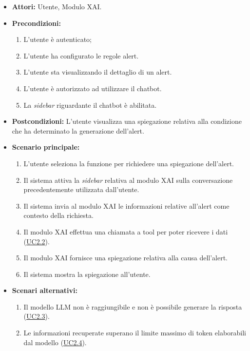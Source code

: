 \label{uc:uc8}
\begin{itemize}
    \item \textbf{Attori:} Utente, Modulo XAI.
    \item \textbf{Precondizioni:} 
        \begin{enumerate}
            \item L'utente è autenticato; 
            \item L'utente ha configurato le regole alert.
            \item L'utente sta visualizzando il dettaglio di un alert.
            \item L'utente è autorizzato ad utilizzare il chatbot.
            \item La \textit{sidebar} riguardante il chatbot è abilitata.
        \end{enumerate}
    \item \textbf{Postcondizioni:} L'utente visualizza una spiegazione relativa alla condizione che ha determinato la generazione dell'alert.
    \item \textbf{Scenario principale:}
        \begin{enumerate}
            \item L'utente seleziona la funzione per richiedere una spiegazione dell'alert.
            \item Il sistema attiva la \textit{sidebar} relativa al modulo XAI sulla conversazione precedentemente utilizzata dall'utente.
            \item Il sistema invia al modulo XAI le informazioni relative all'alert come contesto della richiesta.
            \item Il modulo XAI effettua una chiamata a tool per poter ricevere i dati (\hyperref[uc:uc2.2]{UC2.2}).
            \item Il modulo XAI fornisce una spiegazione relativa alla causa dell'alert.
            \item Il sistema mostra la spiegazione all'utente.
        \end{enumerate}
    \item \textbf{Scenari alternativi:}
            \begin{enumerate}
                \item Il modello LLM non è raggiungibile e non è possibile generare la risposta (\hyperref[uc:uc2.3]{UC2.3}).
                \item Le informazioni recuperate superano il limite massimo di token elaborabili dal modello (\hyperref[uc:uc2.4]{UC2.4}).

\end{enumerate}
\end{itemize}
